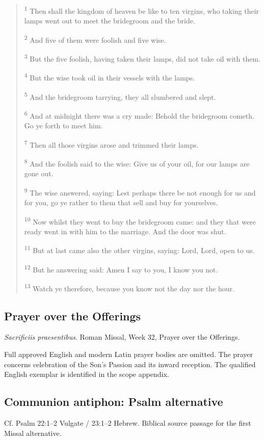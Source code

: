 \begin{quote}
\textsuperscript{1} Then shall the kingdom of heaven be like to ten virgins, who taking their lamps went out to meet the bridegroom and the bride.

\textsuperscript{2} And five of them were foolish and five wise.

\textsuperscript{3} But the five foolish, having taken their lamps, did not take oil with them.

\textsuperscript{4} But the wise took oil in their vessels with the lamps.

\textsuperscript{5} And the bridegroom tarrying, they all slumbered and slept.

\textsuperscript{6} And at midnight there was a cry made: Behold the bridegroom cometh. Go ye forth to meet him.

\textsuperscript{7} Then all those virgins arose and trimmed their lamps.

\textsuperscript{8} And the foolish said to the wise: Give us of your oil, for our lamps are gone out.

\textsuperscript{9} The wise answered, saying: Lest perhaps there be not enough for us and for you, go ye rather to them that sell and buy for yourselves.

\textsuperscript{10} Now whilst they went to buy the bridegroom came: and they that were ready went in with him to the marriage. And the door was shut.

\textsuperscript{11} But at last came also the other virgins, saying: Lord, Lord, open to us.

\textsuperscript{12} But he answering said: Amen I say to you, I know you not.

\textsuperscript{13} Watch ye therefore, because you know not the day nor the hour.
\end{quote}


\subsection{Prayer over the Offerings}
\label{proper-offerings}
\textit{Sacrificiis praesentibus}. Roman Missal, Week 32, Prayer over the Offerings.

Full approved English and modern Latin prayer bodies are omitted. The prayer concerns celebration of the Son's Passion and its inward reception. The qualified English exemplar is identified in the scope appendix.

\subsection{Communion antiphon: Psalm alternative}
\label{proper-communion-psalm}
Cf. Psalm 22:1--2 Vulgate / 23:1--2 Hebrew. Biblical source passage for the first Missal alternative.


